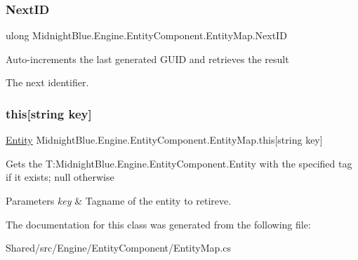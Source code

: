 \subsubsection{\texorpdfstring{Next\+ID}{NextID}}
{\footnotesize\ttfamily ulong Midnight\+Blue.\+Engine.\+Entity\+Component.\+Entity\+Map.\+Next\+ID\hspace{0.3cm}{\ttfamily [get]}}



Auto-\/increments the last generated G\+U\+ID and retrieves the result 

The next identifier.\hypertarget{class_midnight_blue_1_1_engine_1_1_entity_component_1_1_entity_map_aa5372ec92d0acebba09e3571024ea5cc}{}\label{class_midnight_blue_1_1_engine_1_1_entity_component_1_1_entity_map_aa5372ec92d0acebba09e3571024ea5cc} 
\subsubsection{\texorpdfstring{this[string key]}{this[string key]}}
{\footnotesize\ttfamily \hyperlink{class_midnight_blue_1_1_engine_1_1_entity_component_1_1_entity}{Entity} Midnight\+Blue.\+Engine.\+Entity\+Component.\+Entity\+Map.\+this\mbox{[}string key\mbox{]}\hspace{0.3cm}{\ttfamily [get]}}



Gets the T\+:\+Midnight\+Blue.\+Engine.\+Entity\+Component.\+Entity with the specified tag if it exists; null otherwise 


\begin{DoxyParams}{Parameters}
{\em key} & Tagname of the entity to retireve.\\
\hline
\end{DoxyParams}


The documentation for this class was generated from the following file\+:\begin{DoxyCompactItemize}
\item 
Shared/src/\+Engine/\+Entity\+Component/Entity\+Map.\+cs\end{DoxyCompactItemize}
